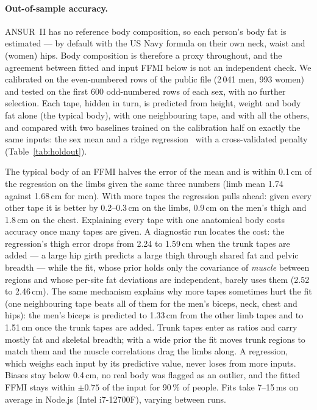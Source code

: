 \documentclass[10pt,twocolumn]{article}
\begin{document}
\paragraph{Out-of-sample accuracy.}
ANSUR~II has no reference body composition, so each person's body fat is estimated --- by default
with the US Navy formula on their own neck, waist and (women) hips. Body composition is therefore a
proxy throughout, and the agreement between fitted and input FFMI below is not an independent check.
We calibrated on the even-numbered rows of the public file (2\,041 men, 993 women) and tested on the
first 600 odd-numbered rows of each sex, with no further selection. Each tape, hidden in turn, is
predicted from height, weight and body fat alone (the typical body), with one neighbouring tape, and
with all the others, and compared with two baselines trained on the calibration half on exactly the
same inputs: the sex mean and a ridge regression~\cite{hoerl1970ridge} with a cross-validated penalty
(Table~\ref{tab:holdout}).

The typical body of an FFMI halves the error of the mean and is within 0.1\,cm of the regression on
the limbs given the same three numbers (limb mean 1.74 against 1.68\,cm for men). With more tapes the
regression pulls ahead: given every other tape it is better by 0.2--0.3\,cm on the limbs, 0.9\,cm on
the men's thigh and 1.8\,cm on the chest. Explaining every tape with one anatomical body costs
accuracy once many tapes are given. A diagnostic run locates the cost: the regression's thigh error
drops from 2.24 to 1.59\,cm when the trunk tapes are added --- a large hip girth predicts a large
thigh through shared fat and pelvic breadth --- while the fit, whose prior holds only the covariance
of \emph{muscle} between regions and whose per-site fat deviations are independent, barely uses
them (2.52 to 2.46\,cm). The same mechanism explains why more tapes sometimes hurt the fit (one
neighbouring tape beats all of them for the men's biceps, neck, chest and hips): the men's biceps is
predicted to 1.33\,cm from the other limb tapes and to 1.51\,cm once the trunk tapes are added. Trunk
tapes enter as ratios and carry mostly fat and skeletal breadth; with a wide prior the fit moves trunk
regions to match them and the muscle correlations drag the limbs along. A regression, which weighs
each input by its predictive value, never loses from more inputs. Biases stay below 0.4\,cm, no real
body was flagged as an outlier, and the fitted FFMI stays within $\pm0.75$ of the input for 90\,\% of
people. Fits take 7--15\,ms on average in Node.js (Intel i7-12700F), varying between runs.
\end{document}
